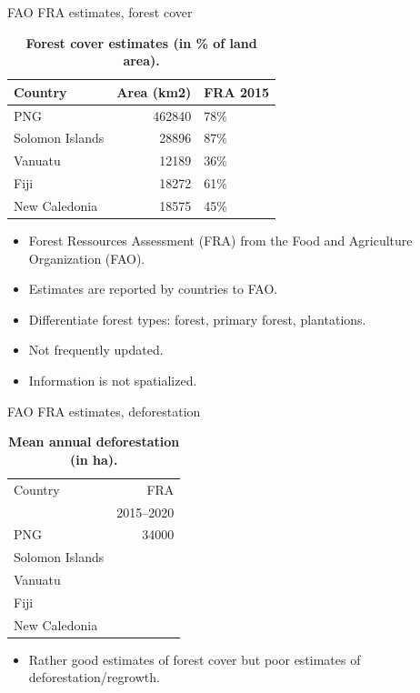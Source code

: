 \documentclass[10pt,table,dvipsnames,compress]{beamer}
\begin{document}
\begin{frame}[label={sec:org8723861}]{FAO FRA estimates, forest cover}
\begin{table}[htbp]
\caption{\textbf{Forest cover estimates (in \% of land area).}}
\centering
\footnotesize
\begin{tabular}{lrl}
Country & Area (km2) & FRA 2015\\[0pt]
\hline
PNG & 462840 & 78\%\\[0pt]
Solomon Islands & 28896 & 87\%\\[0pt]
Vanuatu & 12189 & 36\%\\[0pt]
Fiji & 18272 & 61\%\\[0pt]
New Caledonia & 18575 & 45\%\\[0pt]
\end{tabular}
\end{table}

\begin{itemize}
\item Forest Ressources Assessment (FRA) from the Food and Agriculture Organization (FAO).
\item Estimates are reported by countries to FAO.
\item Differentiate forest types: forest, primary forest, plantations.
\item Not frequently updated.
\item Information is not spatialized.
\end{itemize}
\end{frame}

\begin{frame}[label={sec:orgf7a2177}]{FAO FRA estimates, deforestation}
\begin{table}[htbp]
\caption{\textbf{Mean annual deforestation (in ha).}}
\centering
\footnotesize
\begin{tabular}{lr}
Country & FRA\\[0pt]
 & 2015--2020\\[0pt]
\hline
PNG & 34000\\[0pt]
Solomon Islands & \\[0pt]
Vanuatu & \\[0pt]
Fiji & \\[0pt]
New Caledonia & \\[0pt]
\end{tabular}
\end{table}

\begin{itemize}
\item Rather good estimates of forest cover but poor estimates of deforestation/regrowth.
\end{itemize}
\end{frame}
\end{document}
